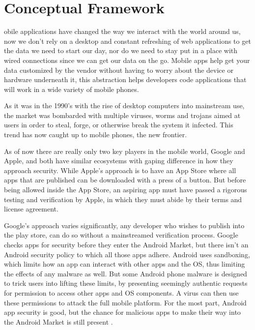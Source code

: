 %
%
\let\textcircled=\pgftextcircled

\chapter{Conceptual Framework}
\label{chap:conceptualFramework}
obile applications have changed the way we interact with the world around us, now we don't rely on a desktop and constant refreshing of web applications to get the data we need to start our day, nor do we need to stay put in a place with wired connections since we can get our data on the go. Mobile apps help get your data customized by the vendor without having to worry about the device or hardware underneath it, this abstraction helps developers code applications that will work in a wide variety of mobile phones.

As it was in the 1990's with the rise of desktop computers into mainstream use, the market was bombarded with multiple viruses, worms and trojans aimed at users in order to steal, forge, or otherwise break the system it infected. This trend has now caught up to mobile phones, the new frontier.

As of now there are really only two key players in the mobile world, Google and Apple, and both have similar ecosystems with gaping difference in how they approach security.
While Apple's approach is to have an App Store where all apps that are published can be downloaded with a press of a button. But before being allowed inside the App Store, an aspiring app must have passed a rigorous testing and verification by Apple, in which they must abide by their terms and license agreement.

Google's approach varies significantly, any developer who wishes to publish into the play store, can do so without a mainstreamed verification process. Google checks apps for security before they enter the Android Market, but there isn’t an Android security policy to which all those apps adhere. Android uses sandboxing, which limits how an app can interact with other apps and the OS, thus limiting the effects of any malware as well. But some Android phone malware is designed to trick users into lifting these limits, by presenting seemingly authentic requests for permission to access other apps and OS components. A virus can then use these permissions to attack the full mobile platform. For the most part, Android app security is good, but the chance for malicious apps to make their way into the Android Market is still present \cite{techtarget}.



